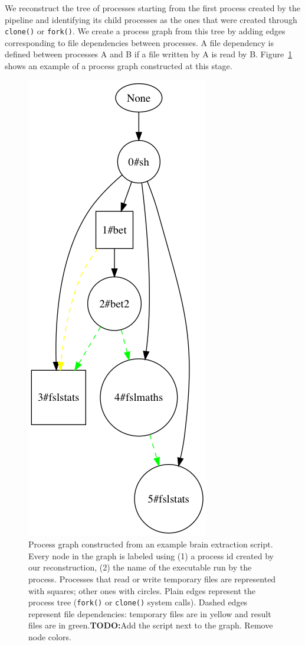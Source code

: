\documentclass{article}
\newcommand{\todo}[1]{\color{red}\textbf{TODO:}#1\color{black}}
\begin{document}
We reconstruct the tree of processes starting from the first process
created by the pipeline and identifying its child processes as the ones
that were created through \texttt{clone()} or \texttt{fork()}. We
create a process graph from this tree by adding edges corresponding to
file dependencies between processes. A file dependency is defined
between processes A and B if a file written by A is read by
B. Figure~\ref{fig:graph-example} shows an example of a process graph
constructed at this stage.

\begin{figure}
  \includegraphics[scale=0.3]{images/simple_graph}
  \caption{Process graph constructed from an example brain extraction
    script. Every node in the graph is labeled using (1) a process id
    created by our reconstruction, (2) the name of the executable run
    by the process. Processes that read or write temporary files are
    represented with squares; other ones with circles. Plain edges
    represent the process tree (\texttt{fork()} or \texttt{clone()}
    system calls). Dashed edges represent file dependencies: temporary
    files are in yellow and result files are in green.\todo{Add the
      script next to the graph. Remove node colors.}}
  \label{fig:graph-example}
\end{figure}
\end{document}
